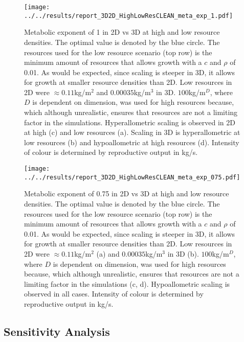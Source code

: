 \documentclass[a4paper, 11pt, hidelinks]{article} %
\begin{document}
		\begin{figure}[H]
		\centering
		\texttt{[image: ../../results/report\_3D2D\_HighLowResCLEAN\_meta\_exp\_1.pdf]}
		
		\caption{Metabolic exponent of 1 in 2D vs 3D at high and low resource densities. The optimal value is denoted by the blue circle.
			The resources used for the low resource scenario (top row) is the minimum amount of resources that allows growth with a $c$ and $\rho$ of 0.01.  As would be expected, since scaling is steeper in 3D, it allows for growth at smaller resource densities than 2D.
			Low resources in 2D were $ \approx 0.11$kg/m$^2 $ and $ 0.00035$kg/m$^3 $ in 3D.
			$ 100$kg/m$^D $, where $D$ is dependent on dimension, was used for high resources because, which although unrealistic, ensures that resources are not a limiting factor in the simulations.
			Hyperallometric scaling is observed in 2D at high (c) and low resources (a).
			Scaling in 3D is hyperallometric at low resources (b) and hypoallometric at high resources (d).
			Intensity of colour is determined by reproductive output in kg/s.}
		\label{resources2D3D_meta_exp1}
	\end{figure}
	\begin{figure}[H]
		
		
		\centering
		\texttt{[image: ../../results/report\_3D2D\_HighLowResCLEAN\_meta\_exp\_075.pdf]}
		
		\caption{Metabolic exponent of 0.75 in 2D vs 3D at high and low resource densities. The optimal value is denoted by the blue circle.
			The resources used for the low resource scenario (top row) is the minimum amount of resources that allows growth with a $c$ and $\rho$ of 0.01.  As would be expected, since scaling is steeper in 3D, it allows for growth at smaller resource densities than 2D.
			Low resources in 2D were $ \approx 0.11$kg/m$^2 $ (a) and $ 0.00035$kg/m$^3 $ in 3D (b).
			$ 100$kg/m$^D $, where $D$ is dependent on dimension, was used for high resources because, which although unrealistic, ensures that resources are not a limiting factor in the simulations (c, d).
			Hypoallometric scaling is observed in all cases.
			Intensity of colour is determined by reproductive output in kg/s.}
		\label{resources2D3D_meta_exp0.75}
	\end{figure}
	
	\subsection{Sensitivity Analysis}
\end{document}

